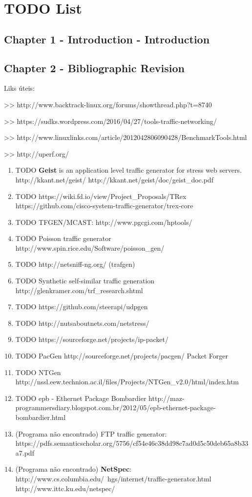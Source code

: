 \chapter{TODO List}


\section{Chapter 1 - Introduction - Introduction}


\section{Chapter 2 - Bibliographic Revision }

Liks úteis: 

>> http://www.backtrack-linux.org/forums/showthread.php?t=8740

>> https://sudks.wordpress.com/2016/04/27/tools-traffic-networking/

>> http://www.linuxlinks.com/article/2012042806090428/BenchmarkTools.html

>> http://uperf.org/

\begin{enumerate}

\item TODO \textbf{Geist}\cite{geist-paper} is an application level traffic generator for stress web servers. http://kkant.net/geist/ http://kkant.net/geist/doc/geist\_doc.pdf 

\item TODO https://wiki.fd.io/view/Project\_Proposals/TRex https://github.com/cisco-system-traffic-generator/trex-core
\item TODO TFGEN/MCAST: http://www.pgcgi.com/hptools/
\item TODO Poisson traffic generator http://www.spin.rice.edu/Software/poisson\_gen/
\item TODO http://netsniff-ng.org/ (trafgen)
\item TODO Synthetic self-similar traffic generation http://glenkramer.com/trf\_research.shtml
\item  TODO https://github.com/steerapi/udpgen
\item TODO  http://nutsaboutnets.com/netstress/
\item TODO https://sourceforge.net/projects/ip-packet/
\item TODO PacGen http://sourceforge.net/projects/pacgen/ Packet Forger
\item TODO NTGen http://nssl.eew.technion.ac.il/files/Projects/NTGen\_v2.0/html/index.htm
\item TODO epb - Ethernet Package Bombardier  http://maz-programmersdiary.blogspot.com.br/2012/05/epb-ethernet-package-bombardier.html 


\item (Programa não encontrado) FTP traffic generator: https://pdfs.semanticscholar.org/5756/cf54e46c38dd98c7ad0d5c50deb65a8b33a7.pdf
\item (Programa não encontrado) \textbf{NetSpec}: http://www.cs.columbia.edu/~hgs/internet/traffic-generator.html http://www.ittc.ku.edu/netspec/

\end{enumerate}

